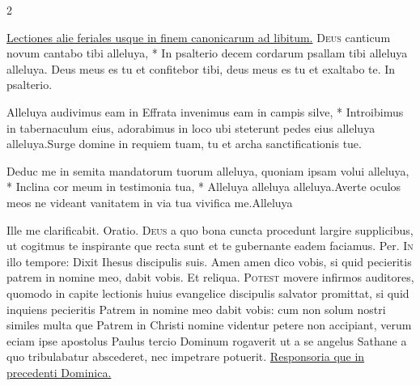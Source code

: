 \begin{multicols*}{2}
\begin{responsory-final}
\end{responsory-final}%
\newline \ul{Lectiones alie feriales usque in finem canonicarum ad libitum.}
\lettrine[lines=2]{\zallmancaps \color{Red} D}{eus} \hypertarget{deus-canticum}{\label{deus-canticum}} canticum novum cantabo tibi alleluya, * In psalterio decem cordarum psallam tibi alleluya alleluya. \V Deus meus es tu et confitebor tibi, deus meus es tu et exaltabo te. In psalterio.
\begin{responsory}
{Alleluya audivimus eam in Effrata invenimus eam in campis silve, * Introibimus in tabernaculum eius, adorabimus in loco ubi steterunt pedes eius alleluya alleluya.}{Surge domine in requiem tuam, tu et archa sanctificationis tue.}
\end{responsory}%
\begin{responsory-final}[deduc-me]
{Deduc me in semita mandatorum tuorum alleluya, quoniam ipsam volui alleluya, * Inclina cor meum in testimonia tua, * Alleluya alleluya alleluya.}{Averte oculos meos ne videant vanitatem in via tua vivifica me.}{Alleluya}
\end{responsory-final}%
{\color{Red} }
 Ille me clarificabit. {\color{Red} Oratio.}
\lettrine[lines=2]{\zallmancaps \color{Blue} D}{eus} a quo bona cuncta procedunt largire supplicibus, ut cogitmus te inspirante que recta sunt et te gubernante eadem faciamus. Per.
\lettrine[lines=2]{\zallmancaps \color{Red} I}{n} illo tempore: Dixit Ihesus discipulis suis. Amen amen dico vobis, si quid pecieritis patrem in nomine meo, dabit vobis. Et reliqua.
 \grecross
\lettrine[lines=2]{\zallmancaps \color{Blue} P}{otest} movere infirmos auditores, quomodo in capite lectionis huius evangelice discipulis salvator promittat, si quid inquiens pecieritis Patrem in nomine meo dabit vobis: cum non solum nostri similes multa que Patrem in Christi nomine videntur petere non accipiant, verum eciam ipse apostolus Paulus tercio Dominum rogaverit ut a se angelus Sathane a quo tribulabatur abscederet, nec impetrare potuerit. \ul{Responsoria que in precedenti Dominica.}

\end{multicols*}
